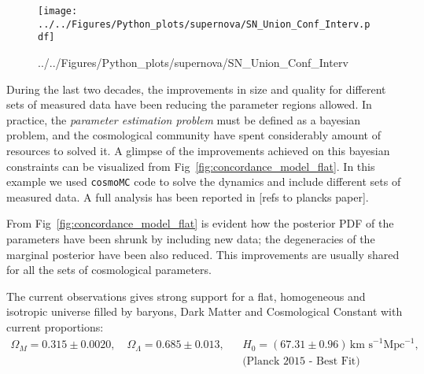 \documentclass[12pt,letterpaper,twoside]{book}
\newcommand\etcomment[1]{\MakeUppercase{\mytexttt{\textcolor{blue}{#1}}}}
\begin{document}
\begin{figure}[tb]
    \centering
    \texttt{[image: ../../Figures/Python\_plots/supernova/SN\_Union\_Conf\_Interv.pdf]}
    \caption{../../Figures/Python\_plots/supernova/SN\_Union\_Conf\_Interv
    \etcomment{Add text in regions}}
    \label{fig:SN_Union_Conf_Interv}
\end{figure}

During the last two decades, the improvements in size and quality for different
sets of measured data have been reducing the parameter regions allowed. In
practice, the \textit{parameter estimation problem} must be defined as a
bayesian problem, and the cosmological community have spent considerably amount
of resources to solved it.  A glimpse of the improvements achieved on this
bayesian constraints can be visualized from
Fig~\ref{fig:concordance_model_flat}. In this example we used \texttt{cosmoMC}
code to solve the dynamics and include different sets of measured data. A full
analysis has been reported in [refs to plancks paper].

From Fig~\ref{fig:concordance_model_flat} is evident how the posterior PDF of
the parameters have been shrunk by including new data; the degeneracies of the
marginal posterior have been also reduced. This improvements are usually shared
for all the sets of cosmological parameters.

The current observations gives strong support for a flat, homogeneous and
isotropic universe filled by baryons, Dark Matter and Cosmological Constant with
current proportions:
%
\begin{eqnarray} \Omega_M = 0.315 \pm 0.0020, \quad \Omega_\Lambda = 0.685 \pm
    0.013, && H_0 = \left(67.31 \pm 0.96\right) \,\mbox{km s}^{-1}
    \mbox{Mpc}^{-1}, \nonumber \\ && \mbox{(Planck 2015 - Best Fit)}
\end{eqnarray}


\end{document}
